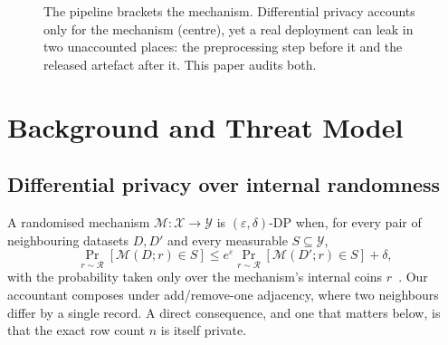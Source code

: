 \documentclass[conference]{IEEEtran}
\newcommand{\eps}{\varepsilon}
\begin{document}
\begin{figure}[t]
\centering
{}
\caption{The pipeline brackets the mechanism. Differential privacy accounts only for the mechanism
(centre), yet a real deployment can leak in two unaccounted places: the preprocessing step before it
and the released artefact after it. This paper audits both.}
\label{fig:pipeline}
\end{figure}

\section{Background and Threat Model}
\subsection{Differential privacy over internal randomness}
A randomised mechanism $\mathcal{M}:\mathcal{X}\!\to\!\mathcal{Y}$ is $(\eps,\delta)$-DP when, for
every pair of neighbouring datasets $D,D'$ and every measurable $S\subseteq\mathcal{Y}$,
\begin{equation}
\Pr_{r\sim\mathcal{R}}[\mathcal{M}(D;r)\in S] \le e^{\eps}\Pr_{r\sim\mathcal{R}}[\mathcal{M}(D';r)\in S]+\delta,
\end{equation}
with the probability taken only over the mechanism's internal coins $r$~\cite{dwork2014,dwork2006}.
Our accountant composes under add/remove-one adjacency, where two neighbours differ by a single
record. A direct consequence, and one that matters below, is that the exact row count $n$ is itself
private.
\end{document}
